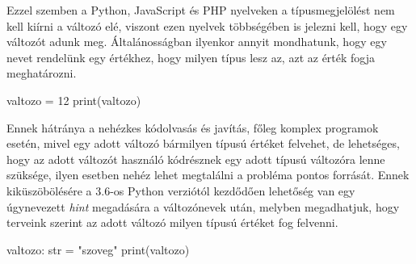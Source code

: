 Ezzel szemben a Python, JavaScript és PHP nyelveken a típusmegjelölést nem kell kiírni a változó elé, viszont ezen nyelvek többségében is jelezni kell, hogy egy változót adunk meg. Általánosságban ilyenkor annyit mondhatunk, hogy egy nevet rendelünk egy értékhez, hogy milyen típus lesz az, azt az érték fogja meghatározni.
\begin{cpp}
	valtozo = 12
	print(valtozo)
\end{cpp}
Ennek hátránya a nehézkes kódolvasás és javítás, főleg komplex programok esetén, mivel egy adott változó bármilyen típusú értéket felvehet, de lehetséges, hogy az adott változót használó kódrésznek egy adott típusú változóra lenne szüksége, ilyen esetben nehéz lehet megtalálni a probléma pontos forrását. Ennek kiküszöbölésére a 3.6-os Python verziótól kezdődően lehetőség van egy úgynevezett \textit{hint} megadására a változónevek után, melyben megadhatjuk, hogy terveink szerint az adott változó milyen típusú értéket fog felvenni.

\begin{cpp}
	valtozo: str = "szoveg"
	print(valtozo)
\end{cpp}


